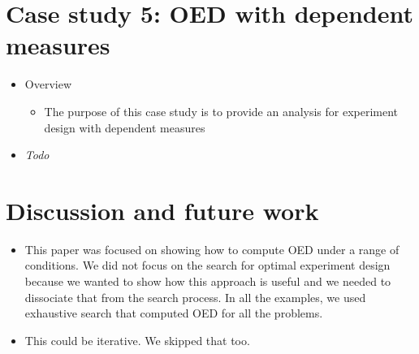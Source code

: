 \documentclass[11pt]{article}
\begin{document}
\section{Case study 5: OED with dependent measures}
    \begin{itemize}
        \item Overview
            \begin{itemize}
                \item The purpose of this case study is to provide an analysis for experiment design with dependent measures
            \end{itemize}
        \item \emph{Todo}
    \end{itemize}

\section{Discussion and future work}

    \begin{itemize}
        \item This paper was focused on showing how to compute OED under a range of conditions. We did not focus on the search for optimal experiment design because we wanted to show how this approach is useful and we needed to dissociate that from the search process. In all the examples, we used exhaustive search that computed OED for all the problems. 
        \item This could be iterative. We skipped that too.
    \end{itemize}



\end{document}

